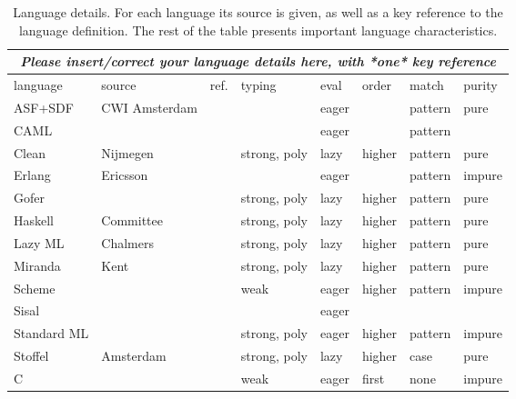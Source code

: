 \begin{table}
\small
\begin{tabular}{|l|ll|lllll|}
\hline
\multicolumn{8}{|c|}{\em Please insert/correct your language details here, with *one* key reference} \\
\hline
language     & source        & ref.        &    typing     &   eval&  order&match  & purity \\
\hline
ASF+SDF      & CWI Amsterdam &\cite{???}   &               &  eager&       &pattern&   pure \\
CAML         &               &\cite{???}   &               &  eager&       &pattern&        \\
Clean        & Nijmegen      &\cite{Pla93} & strong, poly  &   lazy& higher&pattern&   pure \\
Erlang       & Ericsson      &\cite{Arm93} &               &  eager&       &pattern& impure \\
Gofer        &               &\cite{???}   & strong, poly  &   lazy& higher&pattern&   pure \\
Haskell      & Committee     &\cite{Hud92a}& strong, poly  &   lazy& higher&pattern&   pure \\
Lazy ML      & Chalmers      &\cite{Aug89} & strong, poly  &   lazy& higher&pattern&   pure \\
Miranda      & Kent          &\cite{Tur85} & strong, poly  &   lazy& higher&pattern&   pure \\
Scheme       &               &\cite{???}   &   weak        &  eager& higher&pattern& impure \\
Sisal        &               &\cite{???}   &               &  eager&       &       &        \\
Standard ML  &               &\cite{Mil90} & strong, poly  &  eager& higher&pattern& impure \\
Stoffel      & Amsterdam     &\cite{Bee92a}& strong, poly  &   lazy& higher&   case&   pure \\
\hline
C            &               &              &   weak        &  eager&  first&   none& impure \\
\hline
\end{tabular}
\caption{Language details. For each language its source is given, as
well as a key reference to the language definition. The rest of the
table presents important language characteristics.}
\label{tbl:language}
\normalsize
\end{table}


